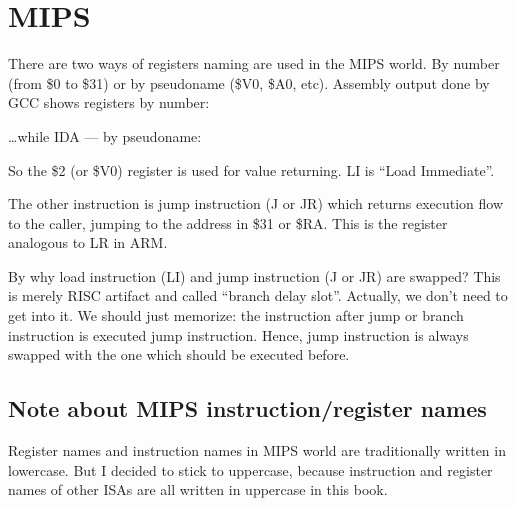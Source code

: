 
\ifdefined\IncludeMIPS
\ifx\RUSSIAN\undefined
\section{MIPS}

\label{MIPS_leaf_function_ex1}
There are two ways of registers naming are used in the MIPS world. By number (from \$0 to \$31)
or by pseudoname (\$V0, \$A0, etc).
Assembly output done by GCC shows registers by number:



\dots while IDA --- by pseudoname:



So the \$2 (or \$V0) register is used for value returning.
LI is ``Load Immediate''.

The other instruction is jump instruction (J or JR) which returns execution flow to the \gls{caller},
jumping to the address in \$31 or \$RA.
This is the register analogous to \ac{LR} in ARM.

By why load instruction (LI) and jump instruction (J or JR) are swapped?
This is merely \ac{RISC} artifact and called ``branch delay slot''.
Actually, we don't need to get into it. We should just memorize: the instruction after jump or branch instruction
is executed  jump instruction.
Hence, jump instruction is always swapped with the one which should be executed before.

\subsection{Note about MIPS instruction/register names}

Register names and instruction names in MIPS world are traditionally written in lowercase.
But I decided to stick to uppercase, because instruction and register names of other \ac{ISA}s 
are all written in uppercase in this book.

\fi
\fi
